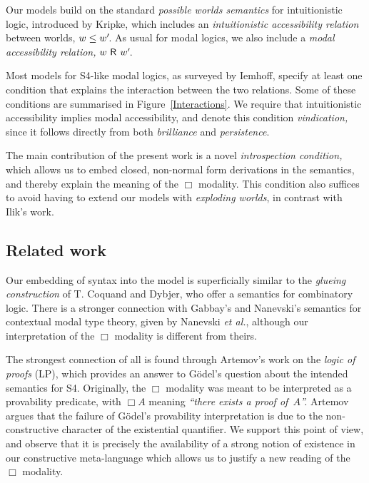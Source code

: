 \documentclass[submission,copyright,creativecommons,sharealike,backref=page]{eptcs}
\newcommand{\R}{\mathrel{\rlap{$\mkern.75mu\textsf{R}$}\hphantom{\subseteq}}}
\renewcommand{\:}{\mathop{\mkern3mu:\mkern3mu}}
\renewcommand{\.}{\mathop{\mkern3mu.\mkern3mu}}
\renewcommand{\;}{\mathop{;}}
\renewcommand{\,}{\mathop{,}}
\theoremstyle{mystyle}
\begin{document}
Our models build on the standard \emph{possible worlds semantics} for intuitionistic logic, introduced by Kripke\cite{Kripke65}, which includes an \emph{intuitionistic accessibility relation} between worlds, $w \le w'\mkern-3mu$.  As usual for modal logics, we also include a \emph{modal accessibility relation,} $w \R w'\mkern-3mu$.

Most models for S4-like modal logics, as surveyed by Iemhoff\cite{Iemhoff01}, specify at least one condition that explains the interaction between the two relations.  Some of these conditions are summarised in Figure~\ref{Interactions}.  We require that intuitionistic accessibility implies modal accessibility, and denote this condition \emph{vindication,} since it follows directly from both \emph{brilliance} and \emph{persistence}.

The main contribution of the present work is a novel \emph{introspection condition,} which allows us to embed closed, non-normal form derivations in the semantics, and thereby explain the meaning of the $\Box$ modality.  This condition also suffices to avoid having to extend our models with \emph{exploding worlds}, in contrast with Ilik's work.


\subsection*{Related work}

Our embedding of syntax into the model is superficially similar to the \emph{glueing construction} of T. Coquand and Dybjer\cite{CoquandD97}, who offer a semantics for combinatory logic.  There is a stronger connection with Gabbay's and Nanevski's\cite{GabbayN13} semantics for contextual modal type theory, given by Nanevski \emph{et al.}\cite{NanevskiPP08}, although our interpretation of the $\Box$ modality is different from theirs.

The strongest connection of all is found through Artemov's\cite{Artemov01} work on the \emph{logic of proofs} (LP), which provides an answer to G{\"o}del's\cite{Godel33} question about the intended semantics for S4.  Originally, the $\Box$ modality was meant to be interpreted as a provability predicate, with $\Box A$ meaning \textsl{``there exists a proof of~$A$''.}  Artemov argues that the failure of G{\"o}del's provability interpretation is due to the non-constructive character of the existential quantifier.  We support this point of view, and observe that it is precisely the availability of a strong notion of existence in our constructive meta-language which allows us to justify a new reading of the $\Box$ modality.
\end{document}
